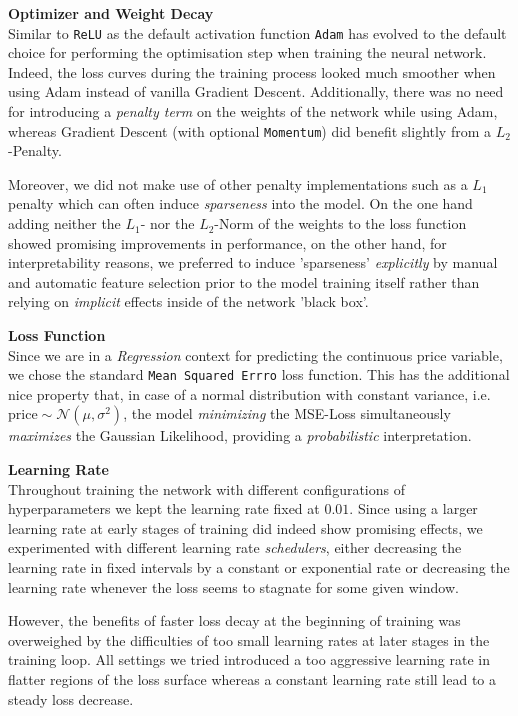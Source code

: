 \documentclass[12pt, letterpaper]{article}
\begin{document}
\textbf{Optimizer and Weight Decay} \\
Similar to \texttt{ReLU} as the default activation function \texttt{Adam} has evolved to the default choice for performing the optimisation step when training the neural network.
Indeed, the loss curves during the training process looked much smoother when using Adam instead of vanilla Gradient Descent.
Additionally, there was no need for introducing a \emph{penalty term} on the weights of the network while using Adam, whereas Gradient Descent (with optional \texttt{Momentum}) did benefit slightly from a $L_2$-Penalty.

Moreover, we did not make use of other penalty implementations such as a $L_1$ penalty which can often induce \emph{sparseness} into the model.
On the one hand adding neither the $L_1$- nor the $L_2$-Norm of the weights to the loss function showed promising improvements in performance, on the other hand, for interpretability reasons, we preferred to induce 'sparseness' \emph{explicitly} by manual and automatic feature selection prior to the model training itself rather than relying on \emph{implicit} effects inside of the network 'black box'.

\textbf{Loss Function} \\
Since we are in a \emph{Regression} context for predicting the continuous price variable, we chose the standard \texttt{Mean Squared Errro} loss function.
This has the additional nice property that, in case of a normal distribution with constant variance, i.e. $\text{price} \sim \mathcal{N} \left(\mu, \sigma^2 \right)$, the model \emph{minimizing} the MSE-Loss simultaneously \emph{maximizes} the Gaussian Likelihood, providing a \emph{probabilistic} interpretation.

\textbf{Learning Rate} \\
Throughout training the network with different configurations of hyperparameters we kept the learning rate fixed at $0.01$.
Since using a larger learning rate at early stages of training did indeed show promising effects, we experimented with different learning rate \emph{schedulers}, either decreasing the learning rate in fixed intervals by a constant or exponential rate or decreasing the learning rate whenever the loss seems to stagnate for some given window.

However, the benefits of faster loss decay at the beginning of training was overweighed by the difficulties of too small learning rates at later stages in the training loop.
All settings we tried introduced a too aggressive learning rate in flatter regions of the loss surface whereas a constant learning rate still lead to a steady loss decrease.
\end{document}
